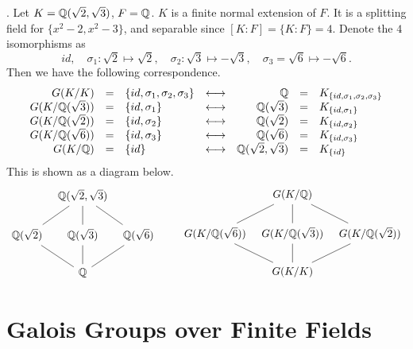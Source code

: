 \ex. Let \(K = \mathbb{Q}(\sqrt{2}, \sqrt{3})\), \(F = \mathbb{Q}\). \(K\) is a finite normal extension of \(F\). It is a splitting field for \(\{x^2 - 2, x^2 - 3\}\), and separable since \([K : F] = \{K : F\} = 4\). Denote the \(4\) isomorphisms as
\[
    id, \quad \sigma_1 : \sqrt{2} \mapsto \sqrt{2}, \quad \sigma_2 : \sqrt{3} \mapsto -\sqrt{3}, \quad \sigma_3 = \sqrt{6} \mapsto -\sqrt{6}.
\]
Then we have the following correspondence.
\[
    \begin{array}{rclcrcl}
        G(K/K)            & = & \{id, \sigma_1, \sigma_2, \sigma_3\} & \longleftrightarrow & \mathbb{Q}                     & = & K_{\{id, \sigma_1, \sigma_2, \sigma_3\}} \\
        G(K/\mathbb{Q}(\sqrt{3})) & = & \{id, \sigma_1\}                     & \longleftrightarrow & \mathbb{Q}(\sqrt{3})           & = & K_{\{id, \sigma_1\}}                     \\
        G(K/\mathbb{Q}(\sqrt{2})) & = & \{id, \sigma_2\}                     & \longleftrightarrow & \mathbb{Q}(\sqrt{2})           & = & K_{\{id, \sigma_2\}}                     \\
        G(K/\mathbb{Q}(\sqrt{6})) & = & \{id, \sigma_3\}                     & \longleftrightarrow & \mathbb{Q}(\sqrt{6})           & = & K_{\{id, \sigma_3\}}                     \\
        G(K/\mathbb{Q})           & = & \{id\}                               & \longleftrightarrow & \mathbb{Q}(\sqrt{2}, \sqrt{3}) & = & K_{\{id\}}
    \end{array}
\]
This is shown as a diagram below.
\[
    \begin{tikzcd}[column sep=tiny]
        & \Q(\sqrt{2}, \sqrt{3}) \arrow[dash]{dl} \arrow[dash]{d} \arrow[dash]{dr} & \\
        \Q(\sqrt{2}) & \Q(\sqrt{3}) & \Q(\sqrt{6}) \\
        & \Q \arrow[dash]{ul} \arrow[dash]{u} \arrow[dash]{ur} &
    \end{tikzcd} \qquad
    \begin{tikzcd}[column sep=tiny]
        & G(K/\Q) \arrow[dash]{dl} \arrow[dash]{d} \arrow[dash]{dr} & \\
        G(K/\Q(\sqrt{6})) & G(K/\Q(\sqrt{3})) & G(K/\Q(\sqrt{2}))   \\
        & G(K/K) \arrow[dash]{ul} \arrow[dash]{u} \arrow[dash]{ur} &
    \end{tikzcd}
\]

\section*{Galois Groups over Finite Fields}


